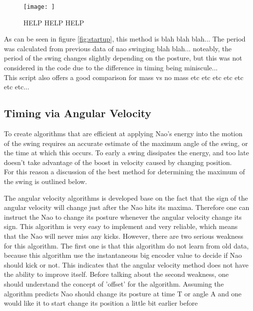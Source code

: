 \documentclass[11pt]{article}
\newcommand*\ruleline[1]{\par\noindent\raisebox{.8ex}{\makebox[\linewidth]{\hrulefill\hspace{1ex}\raisebox{-.8ex}{#1}\hspace{1ex}\hrulefill}}}
\begin{document}
    
    \begin{figure}[!htb]
        \centering
        {\texttt{[image: ]}}
        \caption{HELP HELP HELP}
        \label{fig:test}
    \end{figure}


As can be seen in figure \ref{fig:startup}, this method is blah blah blah... The period was calculated from previous data of nao swinging blah blah... noteably, the period of the swing changes slightly depending on the posture, but this was not considered in the code due to the difference in timing being miniscule... \\

This script also offers a good comparison for mass vs no mass etc etc etc etc etc etc etc...



\subsection{Timing via Angular Velocity}
\ruleline{George Sheppard}
To create algorithms that are efficient at applying Nao's energy into the motion of the swing requires an accurate estimate of the maximum angle of the swing, or the time at which this occurs. To early a swing dissipates the energy, and too late doesn't take advantage of the boost in velocity caused by changing position.\\
For this reason a discussion of the best method for determining the maximum of the swing is outlined below.

\ruleline{Chenglong Li}
The angular velocity algorithms is developed base on the fact that the sign of the angular velocity will change just after the Nao hits its maxima. Therefore one can instruct the Nao to change its posture whenever the angular velocity change its sign. This algorithm is very easy to implement and very reliable, which means that the Nao will never miss any kicks. However, there are two serious weakness for this algorithm. The first one is that this algorithm do not learn from old data, because this algorithm use the instantaneous big encoder value to decide if Nao should kick or not. This indicates that the angular velocity method does not have the ability to improve itself.  Before talking about the second weakness, one should understand the concept of 'offset' for the algorithm. Assuming the algorithm predicts Nao should change its posture at time T or angle A and one would like it to start change its position a little bit earlier before
\end{document}
